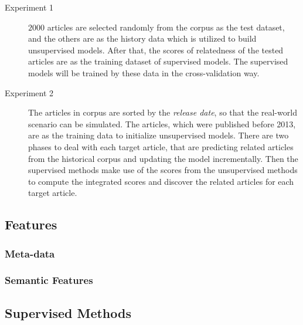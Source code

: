 \begin{description}
\item[Experiment 1] $2000$ articles are selected randomly from the corpus as the test dataset, and the others are as the history data which is utilized to build unsupervised models. After that, the scores of relatedness of the tested articles are as the training dataset of supervised models. The supervised models will be trained by these data in the cross-validation way. 
\item[Experiment 2] The articles in corpus are sorted by the \textit{release date}, so that the real-world scenario can be simulated. The articles, which were published before 2013, are as the training data to initialize unsupervised models. There are two phases to deal with each target article, that are predicting related articles from the historical corpus and updating the model incrementally. Then the supervised methods make use of the scores from the unsupervised methods to compute the integrated scores and discover the related articles for each target article. 
\end{description}

\subsection{Features}

\subsubsection{Meta-data}

\subsubsection{Semantic Features}

\subsection{Supervised Methods}


